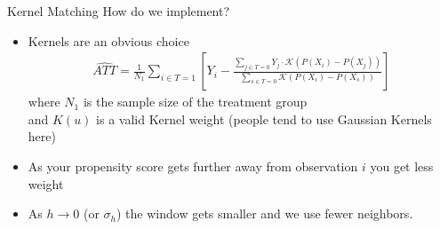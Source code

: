 \documentclass[aspectratio=169,11pt]{beamer}
\begin{document}
\begin{frame}{Kernel Matching}
How do we implement?
\begin{itemize}
\item Kernels are an obvious choice
\begin{align*}
\widehat{ATT} = \frac{1}{N_1} \sum_{i \in T=1} \left[Y_i - \frac{\sum_{j \in T=0} Y_j \cdot \mathcal{K}\left(P(X_i) - P(X_j) \right) }{\sum_{s \in T=0}  \mathcal{K}\left(P(X_i) - P(X_s) \right)}   \right]
\end{align*}
 where $N_1$ is the sample size of the treatment group \\
 and $K(u)$ is a valid Kernel weight (people tend to use Gaussian Kernels here)
\item As your propensity score gets further away from observation $i$ you get less weight
\item As $h \rightarrow 0$  (or $\sigma_h$) the window gets smaller and we use fewer neighbors.
\end{itemize}
\end{frame}


\end{document}
